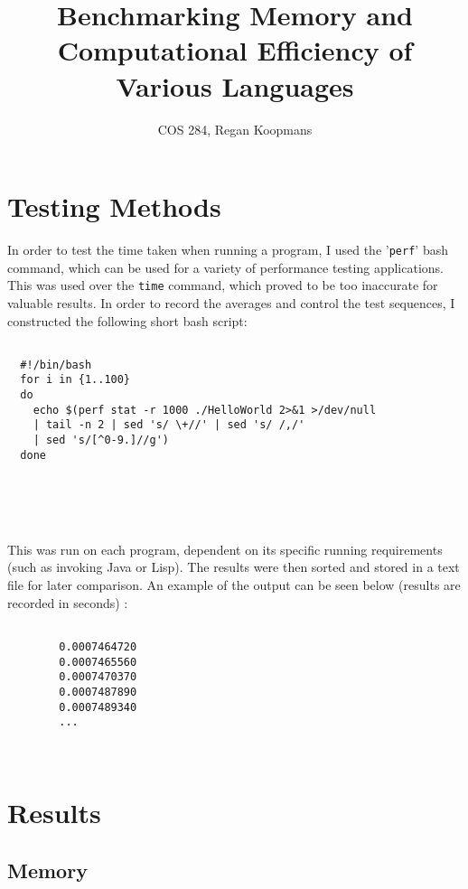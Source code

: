 \documentclass[11pt,a4paper]{article}
\title{Benchmarking Memory and Computational Efficiency of Various Languages}
\author{COS 284, Regan Koopmans}
\begin{document}
	\maketitle
	
	\section*{Testing Methods}
	
		In order to test the time taken when running a program, I used the '\texttt{perf}' bash command, which can be used for a variety of performance testing applications. This was used over the \texttt{time} command, which proved to be too inaccurate for valuable results. In order to record the averages and control the test sequences, I constructed the following short bash script:
	
	\hrulefill
	
		\begin{lstlisting}
		
  #!/bin/bash
  for i in {1..100}
  do
    echo $(perf stat -r 1000 ./HelloWorld 2>&1 >/dev/null 
    | tail -n 2 | sed 's/ \+//' | sed 's/ /,/' 
    | sed 's/[^0-9.]//g')
  done

		
		\end{lstlisting}

	\hrulefill
	\\
	\\	This was run on each program, dependent on its specific running requirements (such as invoking Java or Lisp). The results were then sorted and stored in a text file for later comparison. An example of the output can be seen below (results are recorded in seconds) :
	
			\begin{lstlisting}
			
		0.0007464720
		0.0007465560
		0.0007470370
		0.0007487890
		0.0007489340
		...
			
			
		\end{lstlisting}

	\section*{Results}
		\subsection*{Memory}
		
\end{document}
